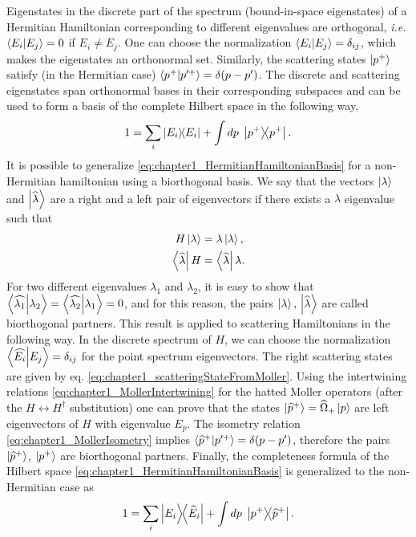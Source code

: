 Eigenstates in the discrete part of the spectrum (bound-in-space eigenstates) of a Hermitian Hamiltonian corresponding to different eigenvalues are orthogonal, \textit{i.e.} $\braket{E_i}{E_j} =0$ if $E_i\neq E_j$. One can choose the normalization $\braket{E_i}{E_j} =\delta_{ij}$, which makes the  eigenstates an orthonormal set. Similarly, the scattering states $\ket{p^+}$ satisfy (in the Hermitian case) $\braket{p^+}{p'^+} =\delta(p-p')$. The discrete and scattering eigenstates span orthonormal bases in their corresponding subspaces and can be used to form a basis of the complete Hilbert space in the following way,
%
\begin{equation}
  1 = \sum_i \ketbra{E_i}{E_i} + \int dp\; \ketbra{p^+}{p^+}.
  \label{eq:chapter1_HermitianHamiltonianBasis}
\end{equation}
%
It is possible to generalize \eqref{eq:chapter1_HermitianHamiltonianBasis} for a non-Hermitian hamiltonian using a biorthogonal basis. We say that the vectors $\ket{\lambda}$ and $\ket{\widehat{\lambda}}$ are a right and a left pair of eigenvectors if there exists a $\lambda$ eigenvalue such that
%
\begin{align}
  H \ket{\lambda} &= \lambda \ket{\lambda},\nonumber\\
  \bra{\widehat{\lambda}} H  &= \bra{\widehat{\lambda}}\lambda.
  \label{eq:chapter1_leftAndRightEigenvector}
\end{align}
%
For two different eigenvalues $\lambda_1$ and $\lambda_2$, it is easy to show that $\braket{\widehat{\lambda_1}}{\lambda_2}=\braket{\widehat{\lambda_2}}{\lambda_1}=0$, and for this reason, the pairs $\ket{\lambda},\,\ket{\widehat{\lambda}}$ are called biorthogonal partners. This result is applied to scattering Hamiltonians in the following way. In the discrete spectrum of $H$, we can choose the normalization $\braket{\widehat{E_i}}{E_j} = \delta_{ij}$ for the point spectrum eigenvectors. The right scattering states are given by eq. \eqref{eq:chapter1_scatteringStateFromMoller}. Using the intertwining relations \eqref{eq:chapter1_MollerIntertwining} for the hatted Moller operators (after the $H\leftrightarrow H^\dagger$ substitution) one can prove that the states $\ket{\widehat{p}^+} = \widehat{\Omega}_+\ket{p}$ are left eigenvectors of $H$ with eigenvalue $E_p$. The isometry relation \eqref{eq:chapter1_MollerIsometry} implies $\braket{\widehat{p}^+}{p'^+} = \delta(p-p')$, therefore the pairs $\ket{\widehat{p}^+}$, $\ket{p^+}$ are biorthogonal partners. Finally, the completeness formula of the Hilbert space \eqref{eq:chapter1_HermitianHamiltonianBasis} is generalized to the non-Hermitian case as
%
\begin{equation}
  1 = \sum_i \ketbra{E_i}{\widehat{E}_i} + \int dp\; \ketbra{p^+}{\widehat{p}^+}.
  \label{eq:chapter1_NonHermitianHamiltonianBasis}
\end{equation}
%

